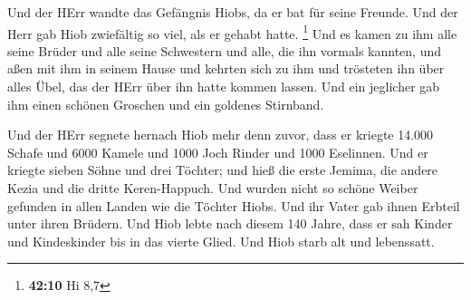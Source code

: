  Und der HErr wandte das Gefängnis Hiobs, da er bat für
seine Freunde. Und der Herr gab Hiob zwiefältig so viel, als er gehabt
hatte. \footnote{\textbf{42:10} Hi 8,7}  Und es kamen zu
ihm alle seine Brüder und alle seine Schwestern und alle, die ihn
vormals kannten, und aßen mit ihm in seinem Hause und kehrten sich zu
ihm und trösteten ihn über alles Übel, das der HErr über ihn hatte
kommen lassen. Und ein jeglicher gab ihm einen schönen Groschen und ein
goldenes Stirnband.

 Und der HErr segnete hernach Hiob mehr denn zuvor, dass
er kriegte 14.000 Schafe und 6000 Kamele und 1000 Joch Rinder und 1000
Eselinnen.  Und er kriegte sieben Söhne und drei Töchter;
 und hieß die erste Jemima, die andere Kezia und die
dritte Keren-Happuch.  Und wurden nicht so schöne Weiber
gefunden in allen Landen wie die Töchter Hiobs. Und ihr Vater gab ihnen
Erbteil unter ihren Brüdern.  Und Hiob lebte nach diesem
140 Jahre, dass er sah Kinder und Kindeskinder bis in das vierte Glied.
 Und Hiob starb alt und lebenssatt.
